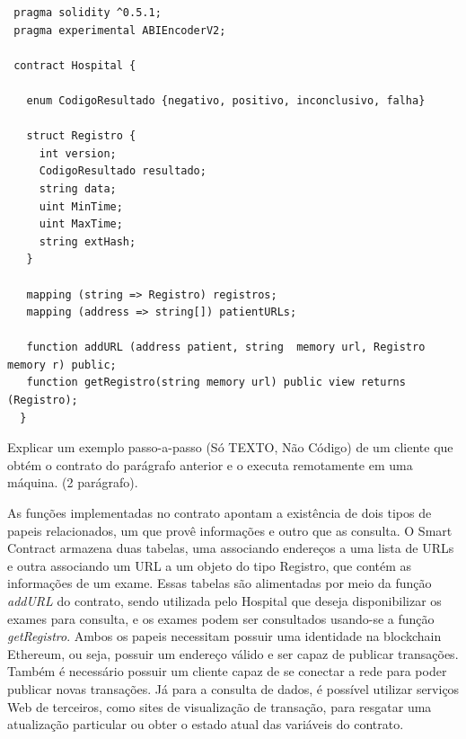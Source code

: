 \documentclass[a4paper,11pt]{article}
\begin{document}
\begin{lstlisting}
 pragma solidity ^0.5.1;
 pragma experimental ABIEncoderV2;

 contract Hospital {

   enum CodigoResultado {negativo, positivo, inconclusivo, falha}

   struct Registro {
     int version;
     CodigoResultado resultado;
     string data;
     uint MinTime;
     uint MaxTime;
     string extHash;
   }

   mapping (string => Registro) registros;
   mapping (address => string[]) patientURLs;

   function addURL (address patient, string  memory url, Registro memory r) public;
   function getRegistro(string memory url) public view returns (Registro);
  }
\end{lstlisting}

{\color{ForestGreen}Explicar um exemplo passo-a-passo (Só TEXTO, Não Código) de um cliente que obtém o contrato do parágrafo anterior e o executa remotamente em uma máquina. (2 parágrafo).}

As funções implementadas no contrato apontam a existência de dois tipos de papeis relacionados, um que provê informações e outro que as consulta.
O Smart Contract armazena duas tabelas, uma associando endereços a uma lista de URLs e outra associando um URL a um objeto do tipo Registro, que contém as informações de um exame.
Essas tabelas são alimentadas por meio da função \emph{addURL} do contrato, sendo utilizada pelo Hospital que deseja disponibilizar os exames para consulta, e os exames podem ser consultados usando-se a função \emph{getRegistro}.
Ambos os papeis necessitam possuir uma identidade na blockchain Ethereum, ou seja, possuir um endereço válido e ser capaz de publicar transações. Também é necessário possuir um cliente capaz de se conectar a rede para poder publicar novas transações.
Já para a consulta de dados, é possível utilizar serviços Web de terceiros, como sites de visualização de transação, para resgatar uma atualização particular ou obter o estado atual das variáveis do contrato.
\end{document}
